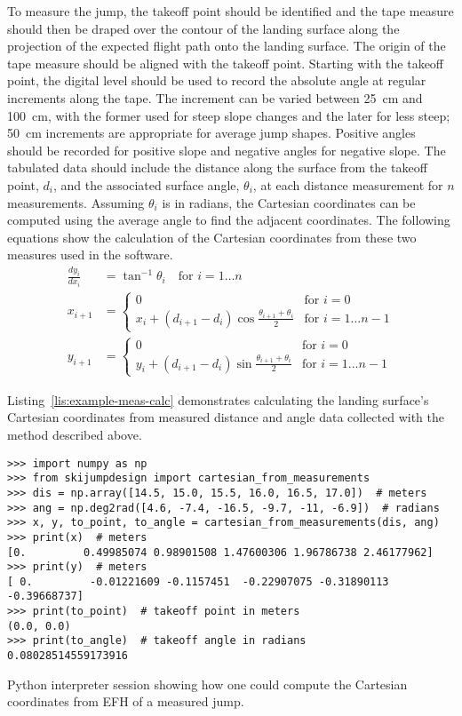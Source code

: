 \documentclass[]{article}
\begin{document}
To measure the jump, the takeoff point should be identified and the tape
measure should then be draped over the contour of the landing surface along the
projection of the expected flight path onto the landing surface. The origin of
the tape measure should be aligned with the takeoff point. Starting with the
takeoff point, the digital level should be used to record the absolute angle at
regular increments along the tape. The increment can be varied between
25~\si{\centi\meter} and 100~\si{\centi\meter}, with the former used for steep
slope changes and the later for less steep; 50~\si{\centi\meter} increments are
appropriate for average jump shapes. Positive angles should be recorded for
positive slope and negative angles for negative slope. The tabulated data
should include the distance along the surface from the takeoff point, $d_i$,
and the associated surface angle, $\theta_i$, at each distance measurement for
$n$ measurements. Assuming $\theta_i$ is in radians, the Cartesian coordinates
can be computed using the average angle to find the adjacent coordinates. The
following equations show the calculation of the Cartesian coordinates from
these two measures used in the software.
%
\begin{align}
  \frac{dy_i}{dx_i} & = \tan^{-1}{\theta_i} \quad \text{for } i=1\ldots n \\
  x_{i + 1} & =
  \begin{cases}
    0 & \text{for } i=0 \\
    x_i + (d_{i+1} - d_i)\cos{\frac{\theta_{i+1} + \theta_i}{2}} &  \text{for }
    i=1\ldots n-1
  \end{cases} \\
  y_{i + 1} & =
  \begin{cases}
    0 & \text{for } i=0 \\
    y_i + (d_{i+1} - d_i)\sin{\frac{\theta_{i+1} + \theta_i}{2}} &  \text{for }
    i=1\ldots n-1
  \end{cases}
\end{align}

Listing~\ref{lis:example-meas-calc} demonstrates calculating the landing
surface's Cartesian coordinates from measured distance and angle data collected
with the method described above.
%
\begin{listing*}
  \begin{verbatim}
>>> import numpy as np
>>> from skijumpdesign import cartesian_from_measurements
>>> dis = np.array([14.5, 15.0, 15.5, 16.0, 16.5, 17.0])  # meters
>>> ang = np.deg2rad([4.6, -7.4, -16.5, -9.7, -11, -6.9])  # radians
>>> x, y, to_point, to_angle = cartesian_from_measurements(dis, ang)
>>> print(x)  # meters
[0.         0.49985074 0.98901508 1.47600306 1.96786738 2.46177962]
>>> print(y)  # meters
[ 0.         -0.01221609 -0.1157451  -0.22907075 -0.31890113 -0.39668737]
>>> print(to_point)  # takeoff point in meters
(0.0, 0.0)
>>> print(to_angle)  # takeoff angle in radians
0.08028514559173916
  \end{verbatim}
  \caption{Python interpreter session showing how one could compute the
  Cartesian coordinates from EFH of a measured jump.}
  \label{lis:example-meas-calc}
\end{listing*}


\end{document}
